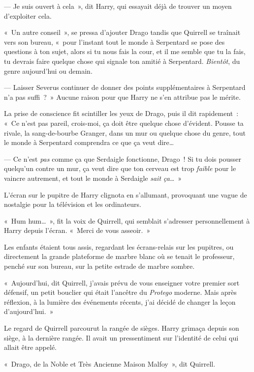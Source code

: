 --- Je suis ouvert à cela~», dit Harry, qui essayait déjà de trouver un moyen d'exploiter cela.

«~Un autre conseil~», se pressa d'ajouter Drago tandis que Quirrell se traînait vers son bureau, «~pour l'instant tout le monde à Serpentard se pose des questions à ton sujet, alors si tu nous fais la cour, et il me semble que tu la fais, tu devrais faire quelque chose qui signale ton amitié à Serpentard.
\emph{Bientôt}, du genre aujourd'hui ou demain.

--- Laisser Severus continuer de donner des points supplémentaires à Serpentard n'a pas suffi~?~»
Aucune raison pour que Harry ne s'en attribue pas le mérite.

La prise de conscience fit scintiller les yeux de Drago, puis il dit rapidement~:
«~Ce n'est pas pareil, crois-moi, ça doit être quelque chose d'évident.
Pousse ta rivale, la sang-de-bourbe Granger, dans un mur ou quelque chose du genre, tout le monde à Serpentard comprendra ce que ça veut dire…

--- Ce n'est \emph{pas} comme ça que Serdaigle fonctionne, Drago~!
Si tu dois pousser quelqu'un contre un mur, ça veut dire que ton cerveau est trop \emph{faible} pour le vaincre autrement, et tout le monde à Serdaigle \emph{sait ça}…~»

L'écran sur le pupitre de Harry clignota en s'allumant, provoquant une vague de nostalgie pour la télévision et les ordinateurs.

«~Hum hum…~», fit la voix de Quirrell, qui semblait s'adresser personnellement à Harry depuis l'écran.
«~Merci de vous asseoir.~»

\later

Les enfants étaient tous assis, regardant les écrans-relais sur les pupitres, ou directement la grande plateforme de marbre blanc où se tenait le professeur, penché sur son bureau, sur la petite estrade de marbre sombre.

«~Aujourd'hui, dit Quirrell, j'avais prévu de vous enseigner votre premier sort défensif, un petit bouclier qui était l'ancêtre du \emph{Protego} moderne.
Mais après réflexion, à la lumière des événements récents, j'ai décidé de changer la leçon d'aujourd'hui.~»

Le regard de Quirrell parcourut la rangée de sièges.
Harry grimaça depuis son siège, à la dernière rangée.
Il avait un pressentiment sur l'identité de celui qui allait être appelé.

«~Drago, de la Noble et Très Ancienne Maison Malfoy~», dit Quirrell.

